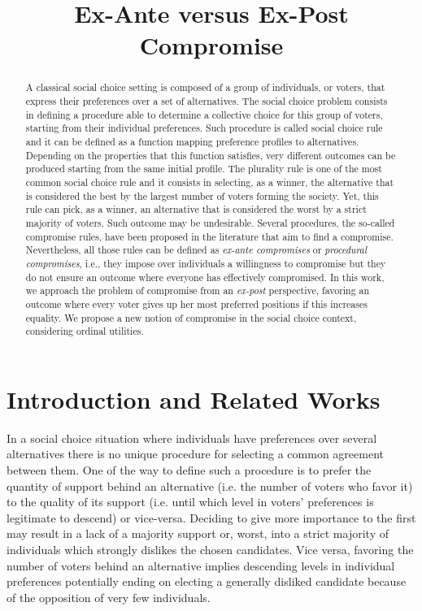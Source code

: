 \documentclass[version=3.21, pagesize, notitlepage, twoside=off, bibliography=totoc, DIV=calc, fontsize=12pt, a4paper]{scrartcl}
\title{Ex-Ante versus Ex-Post \\ Compromise}
\author{}
\date{}
\begin{document}
\maketitle
\thispagestyle{empty}

\begin{abstract}
	A classical social choice setting is composed of a group of individuals, or voters, that express their preferences over a set of alternatives. The social choice problem consists in defining a procedure able to determine a collective choice for this group of voters, starting from their individual preferences. Such procedure is called social choice rule and it can be defined as a function mapping preference profiles to alternatives. Depending on the properties that this function satisfies, very different outcomes can be produced starting from the same initial profile. The plurality rule is one of the most common social choice rule and it consists in selecting, as a winner, the alternative that is considered the best by the largest number of voters forming the society. Yet, this rule can pick, as a winner, an alternative that is considered the worst by a strict majority of voters. Such outcome may be undesirable. Several procedures, the so-called compromise rules, have been proposed in the literature that aim to find a compromise. Nevertheless, all those rules can be defined as \textit{ex-ante compromises} or \textit{procedural compromises}, i.e., they impose over individuals a willingness to compromise but they do not ensure an outcome where everyone has effectively compromised. In this work, we approach the problem of compromise from an \textit{ex-post} perspective, favoring an outcome where every voter gives up her most preferred positions if this increases equality. We propose a new notion of compromise in the social choice context, considering ordinal utilities. 
\end{abstract}

\pagebreak

\section{Introduction and Related Works}

In a social choice situation where individuals have preferences over several alternatives there is no unique procedure for selecting a common agreement between them. One of the way to define such a procedure is to prefer the quantity of support behind an alternative (i.e. the number of voters who favor it) to the quality of its support (i.e. until which level in voters’ preferences is legitimate to descend) or vice-versa. Deciding to give more importance to the first may result in a lack of a majority support or, worst, into a strict majority of individuals which strongly dislikes the chosen candidates. Vice versa, favoring the number of voters behind an alternative implies descending levels in individual preferences potentially ending on electing a generally disliked candidate because of the opposition of very few individuals. 
\end{document}
